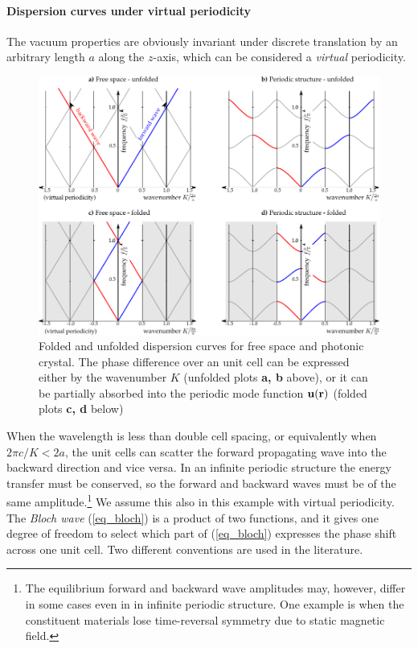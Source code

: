 \paragraph{Dispersion curves under virtual periodicity}%
The vacuum properties are obviously invariant under discrete translation by an arbitrary length $a$ along the $z$-axis, which can be considered a \textit{virtual} periodicity. 

\begin{figure}[ht] \caption{Folded and unfolded dispersion curves for free space and photonic crystal. The phase difference over an unit cell can be expressed either by the wavenumber $K$ (unfolded plots \textbf{a, b} above), or it can be partially absorbed into the periodic mode function $\mathbf{u}({\mathbf{r}})$ (folded plots \textbf{c, d} below) } \label{fg_phc} \centering  %
	\includegraphics[width=17cm]{img/PhC_folding_illustration.pdf} 
\end{figure}
When the wavelength is less than double cell spacing, or equivalently when $2\pi c /K < 2 a$, the unit cells can scatter the forward propagating wave into the backward direction and vice versa. In an infinite periodic structure the energy transfer must be conserved, so the forward and backward waves must be of the same amplitude.\footnote{The equilibrium forward and backward wave amplitudes may, however, differ in some cases even in in infinite periodic structure. One example is when the constituent materials lose time-reversal symmetry due to static magnetic field.} We assume this also in this example with virtual periodicity. The \textit{Bloch wave} (\ref{eq_bloch}) is a product of two functions, and it gives one degree of freedom to select which part of (\ref{eq_bloch}) expresses the phase shift across one unit cell. Two different conventions are used in the literature.
